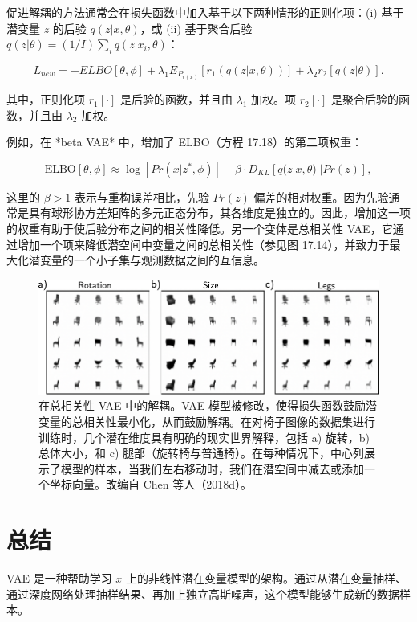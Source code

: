 \documentclass[lang=cn,newtx,10pt,scheme=chinese]{elegantbook}
\begin{document}
促进解耦的方法通常会在损失函数中加入基于以下两种情形的正则化项：(i) 基于潜变量 \(z\) 的后验 \(q(z|x, \theta)\)，或 (ii) 基于聚合后验 \(q(z|\theta) = (1/I) \sum_i q(z|x_i, \theta)\)：

\begin{equation}
L_{new} = -ELBO[\theta, \phi] + \lambda_1 E_{P_{r(x)}} [r_1(q(z|x, \theta))] + \lambda_2 r_2 [q(z|\theta)]. 
\end{equation}

其中，正则化项 \(r_1[\cdot]\) 是后验的函数，并且由 \(\lambda_1\) 加权。项 \(r_2[\cdot]\) 是聚合后验的函数，并且由 \(\lambda_2\) 加权。

例如，在 *beta VAE* 中，增加了 ELBO（方程 17.18）的第二项权重：

\begin{equation}
\text{ELBO}[\theta, \phi] \approx \log[Pr(x|z^*, \phi)] - \beta \cdot D_{KL} [q(z|x, \theta) || Pr(z)], 
\end{equation}

这里的 \(\beta > 1\) 表示与重构误差相比，先验 \(Pr(z)\) 偏差的相对权重。因为先验通常是具有球形协方差矩阵的多元正态分布，其各维度是独立的。因此，增加这一项的权重有助于使后验分布之间的相关性降低。另一个变体是总相关性 VAE，它通过增加一个项来降低潜空间中变量之间的总相关性（参见图 17.14），并致力于最大化潜变量的一个小子集与观测数据之间的互信息。

\begin{figure}[ht!]
\centering
\includegraphics[width=0.7\linewidth]{PDFFigures/UDLChap17PDF/VAEDisentangle.pdf}
\caption{在总相关性 VAE 中的解耦。VAE 模型被修改，使得损失函数鼓励潜变量的总相关性最小化，从而鼓励解耦。在对椅子图像的数据集进行训练时，几个潜在维度具有明确的现实世界解释，包括 a) 旋转，b) 总体大小，和 c) 腿部（旋转椅与普通椅）。在每种情况下，中心列展示了模型的样本，当我们左右移动时，我们在潜空间中减去或添加一个坐标向量。改编自 Chen 等人（2018d）。}
\end{figure}


\section{总结}
VAE 是一种帮助学习 \(x\) 上的非线性潜在变量模型的架构。通过从潜在变量抽样、通过深度网络处理抽样结果、再加上独立高斯噪声，这个模型能够生成新的数据样本。
\end{document}
